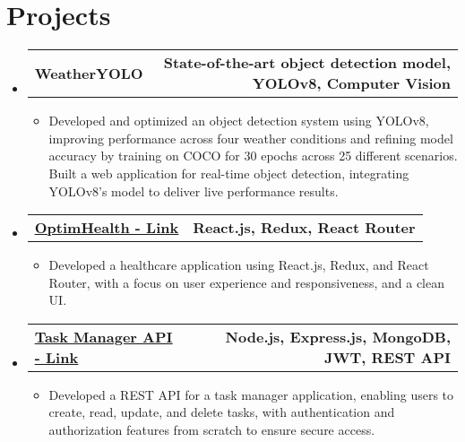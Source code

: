 \documentclass[letterpaper,11pt]{article}
\makeatletter
\newcommand{\resumeItem}[1]{
  \item\small{
    {#1 \vspace{-2pt}}
  }
}
\newcommand{\resumeProjectHeading}[2]{
    \item
    \begin{tabular*}{1.001\textwidth}{l@{\extracolsep{\fill}}r}
      \small#1 & \textbf{\small #2}\\
    \end{tabular*}\vspace{-7pt}
}
\newcommand{\resumeSubHeadingListStart}{\begin{itemize}[leftmargin=0.0in, label={}]}
\newcommand{\resumeSubHeadingListEnd}{\end{itemize}}
\newcommand{\resumeItemListStart}{\begin{itemize}}
\newcommand{\resumeItemListEnd}{\end{itemize}\vspace{-5pt}}
\makeatother
\begin{document}
\section{Projects}
\vspace{-6pt}
\resumeSubHeadingListStart
    \resumeProjectHeading
        {\textbf{WeatherYOLO}  \emph{}}{State-of-the-art object detection model, YOLOv8, Computer Vision}
        \resumeItemListStart
          \resumeItem{Developed and optimized an object detection system using YOLOv8, improving performance 
          across four weather conditions and refining model accuracy by training on COCO for 30 epochs across 25 different scenarios. Built a web application for real-time object detection, integrating YOLOv8’s model to deliver live performance results.}
        \resumeItemListEnd
        \vspace{-16pt}
        \resumeProjectHeading
        {\href{https://github.com/sgandhi15/hc-static}{\underline{\textbf{OptimHealth - Link}}}  \emph{}}{React.js, Redux, React Router}
        \resumeItemListStart
          \resumeItem{Developed a healthcare application using React.js, Redux, and React Router, with a focus on user experience and responsiveness, and a clean UI.}
        \resumeItemListEnd
        \vspace{-16pt}
    \resumeProjectHeading
        {\href{https://github.com/sgandhi15/task-manager-api}{\underline{\textbf{Task Manager API - Link}}}  \emph{}}{Node.js, Express.js, MongoDB, JWT, REST API}
        \resumeItemListStart
            \resumeItem{Developed a REST API for a task manager application, enabling users to create, read, update, and delete tasks, with authentication and authorization features from scratch to ensure secure access.}
        \resumeItemListEnd
  \resumeSubHeadingListEnd
\vspace{-15pt}
\end{document}
